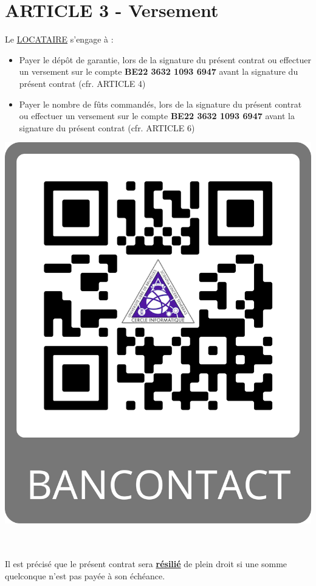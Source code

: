 \documentclass{article}
\begin{document}
\section*{ARTICLE 3 - Versement}
Le \underline{LOCATAIRE} s’engage à :

\begin{minipage}{0.6\textwidth}
\begin{itemize}
    \item Payer le dépôt de garantie, lors de la signature du présent contrat ou effectuer un versement sur le compte \textbf{BE22 3632 1093 6947} avant la signature du présent contrat (cfr. ARTICLE 4)
    \item Payer le nombre de fûts commandés, lors de la signature du présent contrat ou effectuer un versement sur le compte \textbf{BE22 3632 1093 6947} avant la signature du présent contrat (cfr. ARTICLE 6)
\end{itemize}
\end{minipage}
\begin{minipage}{0.4\textwidth}\raggedleft
\includegraphics[scale=0.04]{images/QRCodeBancontact.png}
\end{minipage}\\\\
Il est précisé que le présent contrat sera \textbf{\underline{résilié}} de plein droit si une somme quelconque n’est pas payée à son échéance.
\end{document}
